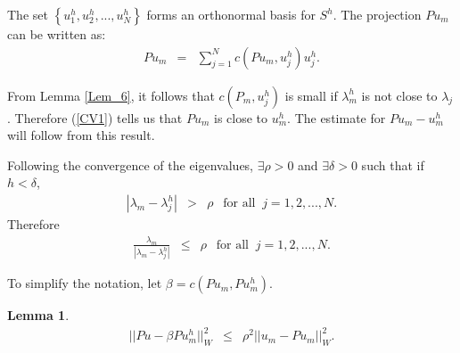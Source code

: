 \documentclass[../../main.tex]{subfiles}
\begin{document}
The set $\left\{u_{1}^{h},u_{2}^{h},...,u_{N}^{h}\right\}$ forms an orthonormal basis for $S^{h}$. The projection $Pu_{m}$ can be written as:
\begin{eqnarray}
	Pu_{m} &=& \sum_{j=1}^{N} c( P u_{m} ,u_{j}^{h}) u_{j}^{h}. \label{CV1}
\end{eqnarray}


From Lemma \ref{Lem_6}, it follows that $c( P_{m},u_{j}^{h} )$ is small if $\lambda_{m}^{h}$ is not close to $\lambda_{j}$. Therefore (\ref{CV1}) tells us that $Pu_{m}$ is close to $u_{m}^{h}$. The estimate for $Pu_{m} - u_{m}^{h}$ will follow from this result.


Following the convergence of the eigenvalues, $\exists \rho > 0$ and $\exists \delta > 0$ such that if $h<\delta$,
\begin{eqnarray}
|\lambda_{m} - \lambda_{j}^{h}| &>& \rho \ \ \textrm{ for all } \ j = 1,2,...,N.
\end{eqnarray}
Therefore
\begin{eqnarray}
\frac{\lambda_{m}}{|\lambda_{m} - \lambda_{j}^{h}|} &\leq & \rho \ \ \textrm{ for all } \ j = 1,2,...,N.
\end{eqnarray}

To simplify the notation, let $\beta = c(Pu_m,Pu_m^h)$.

\newtheorem{Lem_7}[Lem_1]{Lemma} 
\begin{Lem_7}
	\label{Lem_7}
	\begin{eqnarray*}
		||Pu - \beta Pu^h_m||_{W}^{2} &\leq & {\rho}^{2} ||u_{m} - Pu_{m}||_{W}^{2}.
	\end{eqnarray*}
\end{Lem_7}
\begin{comment}
\begin{proof}

Using Lemma \ref{Lem_6}:
\begin{eqnarray*}
||Pu - \beta u_{m}^{h}||_{W}^{2} &=& \sum_{j\neq m} \left(\frac{\lambda_{m}}{|\lambda_{m} - \lambda_{j}^{h}|}\right)^{2} c( u_{m} - Pu_{m} ,u_{j}^{h})^{2},\\
				&\leq & \rho^{2} \sum_{j\neq m} c( u_{m} - Pu_{m} ,u_{j}^{h})^{2}, \\
				&\leq & \rho^{2} \sum_{j=1}^{N} c( u_{m} - Pu_{m} ,u_{j}^{h})^{2}, \\
				& = & \rho^{2} ||u_m - Pu_m||_{W}^{2}.\\
\end{eqnarray*}
\end{proof}
\end{comment}
\end{document}
